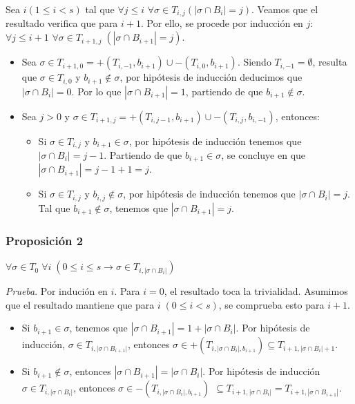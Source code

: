 \documentclass[12pt, letterpaper, twoside]{article}
\begin{document}
    Sea $i (1\leq{i}<s)$ tal que $\forall{j}\leq{i}$ $\forall\sigma\in{T_{i,j}}(|\sigma\cap{B_i}|=j)$. Veamos que el resultado verifica que para $i+1$. Por ello, se procede por inducción en $j$: $\forall{j}\leq{i+1}$ $\forall\sigma\in{T_{i+1, j}}\;(|\sigma\cap{B_{i+1}}|=j)$.
    \begin{itemize}
        \item Sea $\sigma\in{T_{i+1, 0}}=+(T_{i, -1}, b_{i+1})\cup-(T_{i,0},b_{i+1})$. Siendo $T_{i,-1}=\emptyset$, resulta que $\sigma\in{T_{i,0}}$ y $b_{i+1}\notin\sigma$, por hipótesis de inducción deducimos que $|\sigma\cap{B_i}|=0$. Por lo que $|\sigma\cap{B_{i+1}}|=1$, partiendo de que $b_{i+1}\notin\sigma$.
        \item Sea $j>0$ y $\sigma\in{T_{i+1,j}}=+(T_{i,j-1}, b_{i+1})\cup-(T_{i,j},b_{i,-1})$, entonces:
        \begin{itemize}
            \item Si $\sigma\in{T_{i,j}}$ y $b_{i+1}\in\sigma$, por hipótesis de inducción tenemos que $|\sigma\cap{B_i}|=j-1$. Partiendo de que $b_{i+1}\in\sigma$, se concluye en que $|\sigma\cap{B_{i+1}}|=j-1+1=j$.
            \item Si $\sigma\in{T_{i,j}}$ y $b_{i,j}\notin\sigma$, por hipótesis de inducción tenemos que $|\sigma\cap{B_i}|=j$. Tal que $b_{i+1}\notin\sigma$, tenemos que $|\sigma\cap{B_{i+1}}|=j$.
        \end{itemize}
    \end{itemize}
    \subsubsection{Proposición 2}
    $\forall\sigma\in{T_0}\;\forall{i}\;(0\leq{i}\leq{s}\rightarrow\sigma\in{T_{i,|\sigma\cap{B_i}|}})$


    \emph{Prueba}. Por indución en $i$. Para $i=0$, el resultado toca la trivialidad. Asumimos que el resultado mantiene que para $i\;(0\leq{i}<s)$, se comprueba esto para $i+1$.
    \begin{itemize}
        \item Si $b_{i+1}\in\sigma$, tenemos que $|\sigma\cap{B_{i+1}}|=1 + |\sigma\cap{B_i}|$. Por hipótesis de inducción, $\sigma\in{T_{i,|\sigma\cap{B_{i+1}|}}}$, entonces $\sigma\in{+(T_{i,|\sigma\cap{B_i}|,b_{i+1}})}\subseteq{T_{i+1,|\sigma\cap{B_i}|+1}}$.
        \item Si $b_{i+1}\notin\sigma$, entonces $|\sigma\cap{B_{i+1}}|=|\sigma\cap{B_i}|$. Por hipótesis de inducción $\sigma\in{T_{i, |\sigma\cap{B_i}|}}$, entonces $\sigma\in{-(T_{i,|\sigma\cap{B_i}|, b_{i+1}})}$ $\subseteq{T_{i+1, |\sigma\cap{B_i}|}}=T_{i+1, |\sigma\cap{B_{i+1}}|}$.
    \end{itemize}
\end{document}
